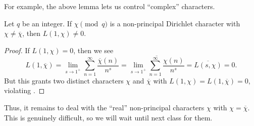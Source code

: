\documentclass[../notes.tex]{subfiles}
\begin{document}
For example, the above lemma lets us control ``complex'' characters.
\begin{lemma} \label{lem:complex-l-chi}
	Let $q$ be an integer. If $\chi\pmod q$ is a non-principal Dirichlet character with $\chi\ne\overline\chi$, then $L(1,\chi)\ne0$.
\end{lemma}
\begin{proof}
	If $L(1,\chi)=0$, then we see
	\[L(1,\overline\chi)=\lim_{s\to1^+}\sum_{n=1}^\infty\frac{\overline\chi(n)}{n^s}=\overline{\lim_{s\to1^+}\sum_{n=1}^\infty\frac{\chi(n)}{n^s}}=\overline{L(s,\chi)}=0.\]
	But this grants two distinct characters $\chi$ and $\overline\chi$ with $L(1,\chi)=L(1,\overline\chi)=0$, violating .
\end{proof}
Thus, it remains to deal with the ``real'' non-principal characters $\chi$ with $\chi=\overline\chi$. This is genuinely difficult, so we will wait until next class for them.
\end{document}
